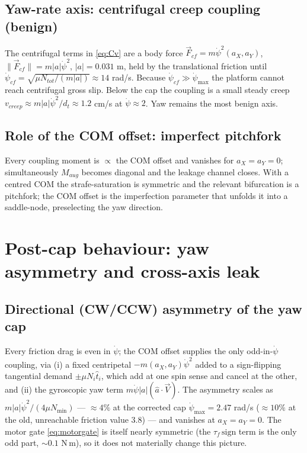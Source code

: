 \documentclass[11pt]{article}
\begin{document}
\subsection{Yaw-rate axis: centrifugal creep coupling (benign)}
The centrifugal terms in \eqref{eq:Cv} are a body force
$\vec F_{cf}=m\dot\psi^2(a_X,a_Y)$, $\|\vec F_{cf}\|=m|a|\dot\psi^2$, $|a|=0.031$ m, held by the
translational friction until $\dot\psi_{cf}=\sqrt{\mu N_{tot}/(m|a|)}\approx14$ rad/s. Because
$\dot\psi_{cf}\gg\dot\psi_{\max}$ the platform cannot reach centrifugal gross slip. Below the cap
the coupling is a small steady creep $v_{creep}\approx m|a|\dot\psi^2/d_t\approx1.2$ cm/s at
$\dot\psi\approx2$. Yaw remains the most benign axis.

\subsection{Role of the COM offset: imperfect pitchfork}
Every coupling moment is $\propto$ the COM offset and vanishes for $a_X=a_Y=0$; simultaneously
$M_{aug}$ becomes diagonal and the leakage channel closes. With a centred COM the strafe-saturation
is symmetric and the relevant bifurcation is a pitchfork; the COM offset is the imperfection
parameter that unfolds it into a saddle-node, preselecting the yaw direction.

\section{Post-cap behaviour: yaw asymmetry and cross-axis leak}
\subsection{Directional (CW/CCW) asymmetry of the yaw cap}
Every friction drag is even in $\dot\psi$; the COM offset supplies the only odd-in-$\dot\psi$
coupling, via (i) a fixed centripetal $-m(a_X,a_Y)\dot\psi^2$ added to a sign-flipping tangential
demand $\pm\mu N_i\hat t_i$, which add at one spin sense and cancel at the other, and (ii) the
gyroscopic yaw term $m\dot\psi|a|(\hat a\cdot\vec V)$. The asymmetry scales as
$m|a|\dot\psi^2/(4\mu N_{\min})$ --- $\approx4\%$ at the corrected cap $\dot\psi_{\max}=2.47$
rad/s ($\approx10\%$ at the old, unreachable friction value 3.8) --- and vanishes at $a_X=a_Y=0$.
The motor gate \eqref{eq:motorgate} is itself nearly symmetric (the $\tau_f\,\mathrm{sign}$ term
is the only odd part, $\sim0.1$ N\,m), so it does not materially change this picture.
\end{document}
